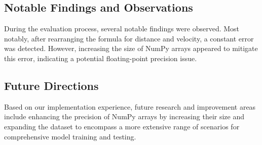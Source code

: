 







\subsection{Notable Findings and Observations} 
During the evaluation process, several notable findings were observed. 
Most notably, after rearranging the formula for distance and velocity, a constant error was detected. 
However, increasing the size of NumPy arrays appeared to mitigate this error, indicating a potential 
floating-point precision issue.

\subsection{Future Directions} 
Based on our implementation experience, future research and improvement areas include enhancing the 
precision of NumPy arrays by increasing their size and expanding the dataset to encompass a more extensive
range of scenarios for comprehensive model training and testing.

